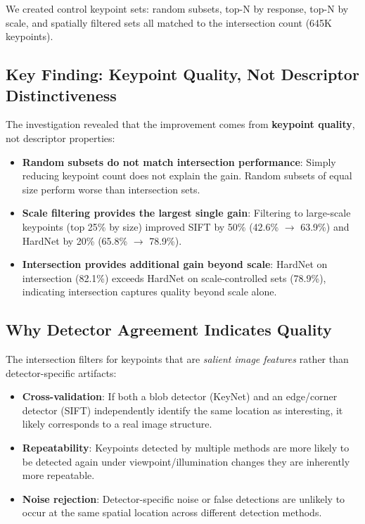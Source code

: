 We created control keypoint sets: random subsets, top-N by response, top-N by scale, and spatially filtered sets all matched to the intersection count (645K keypoints).

\subsection{Key Finding: Keypoint Quality, Not Descriptor Distinctiveness}

The investigation revealed that the improvement comes from \textbf{keypoint quality}, not descriptor properties:

\begin{itemize}
    \item \textbf{Random subsets do not match intersection performance}: Simply reducing keypoint count does not explain the gain. Random subsets of equal size perform worse than intersection sets.

    \item \textbf{Scale filtering provides the largest single gain}: Filtering to large-scale keypoints (top 25\% by size) improved SIFT by 50\% (42.6\% $\rightarrow$ 63.9\%) and HardNet by 20\% (65.8\% $\rightarrow$ 78.9\%).

    \item \textbf{Intersection provides additional gain beyond scale}: HardNet on intersection (82.1\%) exceeds HardNet on scale-controlled sets (78.9\%), indicating intersection captures quality beyond scale alone.
\end{itemize}

\subsection{Why Detector Agreement Indicates Quality}

The intersection filters for keypoints that are \textit{salient image features} rather than detector-specific artifacts:

\begin{itemize}
    \item \textbf{Cross-validation}: If both a blob detector (KeyNet) and an edge/corner detector (SIFT) independently identify the same location as interesting, it likely corresponds to a real image structure.

    \item \textbf{Repeatability}: Keypoints detected by multiple methods are more likely to be detected again under viewpoint/illumination changes they are inherently more repeatable.

    \item \textbf{Noise rejection}: Detector-specific noise or false detections are unlikely to occur at the same spatial location across different detection methods.
\end{itemize}

